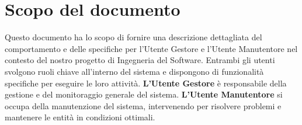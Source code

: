 \chapter{Scopo del documento}

Questo documento ha lo scopo di fornire una descrizione dettagliata del comportamento e delle specifiche per l'Utente Gestore e l'Utente Manutentore nel contesto del nostro progetto di Ingegneria del Software. Entrambi gli utenti svolgono ruoli chiave all'interno del sistema e dispongono di funzionalità specifiche per eseguire le loro attività.
\newline\newline
\textbf{L'Utente Gestore }è responsabile della gestione e del monitoraggio generale del sistema.
\newline\newline
\textbf{L'Utente Manutentore }si occupa della manutenzione del sistema, intervenendo per risolvere problemi e mantenere le entità in condizioni ottimali. 
